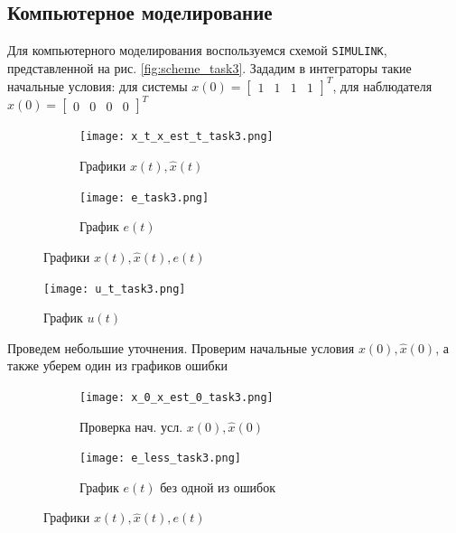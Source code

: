 \documentclass[a4paper, 12pt]{article}
\begin{document}
    \subsection{Компьютерное моделирование}
    Для компьютерного моделирования воспользуемся схемой \texttt{SIMULINK},
    представленной на рис. \ref{fig:scheme_task3}. Зададим в интеграторы
    такие начальные условия: для системы $x(0)=\begin{bmatrix}
        1 &1 &1 &1
    \end{bmatrix}^T$, для наблюдателя $\hat{x}(0)=\begin{bmatrix}
        0 &0 &0 &0
    \end{bmatrix}^T$
    \begin{figure}[H]
        \centering
        \begin{subfigure}{0.45\textwidth}
            \centering
            \texttt{[image: x\_t\_x\_est\_t\_task3.png]}
            \caption{Графики $x(t),\hat{x}(t)$}
            \label{fig:task_3_x_t}
        \end{subfigure}
        \hfill
        \begin{subfigure}{0.45\textwidth}
            \centering
            \texttt{[image: e\_task3.png]}
            \caption{График $e(t)$}
            \label{fig:task_3_e}
        \end{subfigure}
        \caption{Графики $x(t),\hat{x}(t),e(t)$}
        \label{fig:task_3_modeling}
    \end{figure}
    \begin{figure}[H]
        \centering
        \texttt{[image: u\_t\_task3.png]}
        \captionsetup{skip=0pt}
        \caption{График $u(t)$}
        \label{fig:u_t_task3}
    \end{figure}
    \noindent Проведем небольшие уточнения. Проверим начальные условия $x(0),\hat{x}(0)$, а также уберем
    один из графиков ошибки
    \begin{figure}[H]
        \centering
        \begin{subfigure}{0.45\textwidth}
            \centering
            \texttt{[image: x\_0\_x\_est\_0\_task3.png]}
            \caption{Проверка нач. усл. $x(0),\hat{x}(0)$}
            \label{fig:x_0_check_2}
        \end{subfigure}
        \hfill
        \begin{subfigure}{0.45\textwidth}
            \centering
            \texttt{[image: e\_less\_task3.png]}
            \caption{График $e(t)$ без одной из ошибок}
            \label{fig:task_3_e_less}
        \end{subfigure}
        \caption{Графики $x(t),\hat{x}(t),e(t)$}
        \label{fig:task_3_modeling_2}
    \end{figure}
\end{document}
